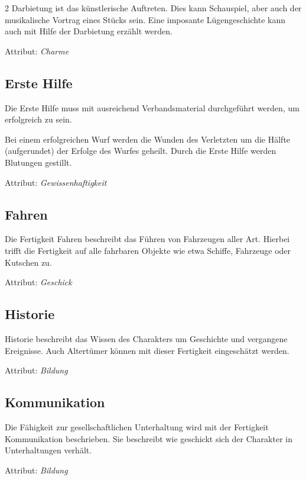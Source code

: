 \begin{multicols}{2}
Darbietung ist das künstlerische Auftreten. Dies kann Schauspiel, aber auch der musikalische Vortrag eines Stücks sein. Eine imposante Lügengeschichte kann auch mit Hilfe der Darbietung erzählt werden.

Attribut: \textit{Charme}

\subsection{Erste Hilfe}

Die Erste Hilfe muss mit ausreichend Verbandsmaterial durchgeführt werden, um erfolgreich zu sein.

Bei einem erfolgreichen Wurf werden die Wunden des Verletzten um die Hälfte (aufgerundet) der Erfolge des Wurfes geheilt. Durch die Erste Hilfe werden Blutungen gestillt.

Attribut: \textit{Gewissenhaftigkeit}

\subsection{Fahren}

Die Fertigkeit Fahren beschreibt das Führen von Fahrzeugen aller Art. Hierbei trifft die Fertigkeit auf alle fahrbaren Objekte wie etwa Schiffe, Fahrzeuge oder Kutschen zu.

Attribut: \textit{Geschick}

\subsection{Historie}

Historie beschreibt das Wissen des Charakters um Geschichte und vergangene Ereignisse. Auch Altertümer können mit dieser Fertigkeit eingeschätzt werden.

Attribut: \textit{Bildung}

\subsection{Kommunikation}

Die Fähigkeit zur gesellschaftlichen Unterhaltung wird mit der Fertigkeit Kommunikation beschrieben. Sie beschreibt wie geschickt sich der Charakter in Unterhaltungen verhält.

Attribut: \textit{Bildung}


\end{multicols}
